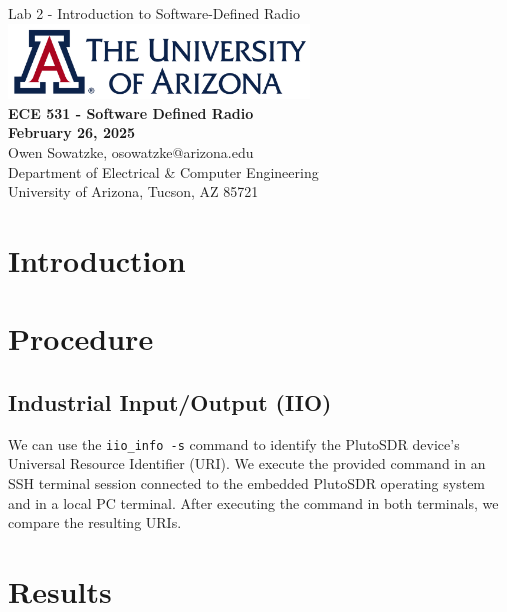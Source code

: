 \documentclass{article}
\begin{document}
\begin{titlepage}
	\centering
	{\huge Lab 2 - Introduction to Software-Defined Radio}\\[0.25 in]
	\includegraphics[width=0.6\textwidth]{ua_logo.png}\\[0.25 in]
	{\large \textbf{ECE 531 - Software Defined Radio\\[0.25 in]
	February 26, 2025\\[0.25 in]}}
	{\large Owen Sowatzke, osowatzke@arizona.edu\\[0.05 in]
	Department of Electrical \& Computer Engineering\\[0.05 in]
	University of Arizona, Tucson, AZ 85721\\[0.5 in]}
	\hypersetup{linkcolor=navy-blue}
	\noindent\hrulefill
	\tableofcontents
	\noindent\hrulefill
\end{titlepage}

\setlength{\parindent}{0pt}

\section{Introduction}

\section{Procedure}

\subsection{Industrial Input/Output (IIO)}

We can use the \texttt{iio\_info -s} command to identify the PlutoSDR device's Universal Resource Identifier (URI). We execute the provided command in an SSH terminal session connected to the embedded PlutoSDR operating system and in a local PC terminal. After executing the command in both terminals, we compare the resulting URIs.

\section{Results}
\end{document}
